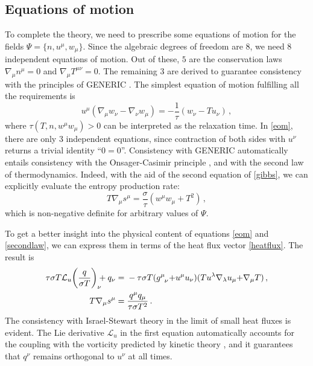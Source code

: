 \documentclass[a4paper, amsfonts, amssymb, amsmath, reprint, showkeys, nofootinbib, twoside, onecolumn, notitlepage]{revtex4-1}
\begin{document}
\subsection{Equations of motion}

To complete the theory, we need to prescribe some equations of motion for the fields $\Psi=\{n,u^\mu,w_\mu \}$. Since the algebraic degrees of freedom are $8$, we need $8$ independent equations of motion. Out of these, $5$ are the conservation laws $\nabla_\mu n^\mu=0$ and $\nabla_\mu T^{\mu \nu}=0$. The remaining $3$ are derived to guarantee consistency with the principles of GENERIC \cite{Grmela1997}. The simplest equation of motion fulfilling all the requirements is \cite{OttingerSoloHeat1998}
\begin{equation}\label{eom}
    u^\mu (\nabla_\mu w_\nu -\nabla_\nu w_\mu)=-\dfrac{1}{\tau} (w_\nu-Tu_\nu) \, ,
\end{equation}
where $\tau(T,n,w^\mu w_\mu)>0$ can be interpreted as the relaxation time. In \eqref{eom}, there are only $3$ independent equations, since contraction of both sides with $u^\nu$ returns a trivial identity ``$0{=}0$''. Consistency with GENERIC automatically entails consistency with the Onsager-Casimir principle \cite{Grmela2014,GavassinoCasimir2022}, and with the second law of thermodynamics. Indeed, with the aid of the second equation of \eqref{gibbs}, we can explicitly evaluate the entropy production rate:
\begin{equation}\label{secondlaw}
    T \nabla_\mu s^\mu = \dfrac{\sigma}{\tau} (w^\mu w_\mu +T^2) \, ,
\end{equation}
which is non-negative definite for arbitrary values of $\Psi$.

To get a better insight into the physical content of equations \eqref{eom} and \eqref{secondlaw}, we can express them in terms of the heat flux vector \eqref{heatflux}. The result is
\begin{equation}\label{grippont}
    \begin{split}
    \tau \sigma T \mathcal{L}_u\bigg( \dfrac{q}{\sigma T}\bigg)_\nu \! \! \! +q_\nu ={}& -\tau \sigma T (g\indices{^\mu _\nu}{+}u^\mu u_\nu)(T u^\lambda \nabla_\lambda u_\mu {+}\nabla_\mu T) \, , \\
T\nabla_\mu s^\mu ={}& \dfrac{q^\mu q_\mu}{\tau \sigma T^2} \, .\\
    \end{split}
\end{equation}
The consistency with Israel-Stewart theory \cite{Israel_Stewart_1979,Hishcock1983} in the limit of small heat fluxes is evident. The Lie derivative $\mathcal{L}_u$ in the first equation automatically accounts for the coupling with the vorticity predicted by kinetic theory \cite{Denicol2012Boltzmann}, and it guarantees that $q^\nu$ remains orthogonal to $u^\nu$ at all times.
\end{document}
